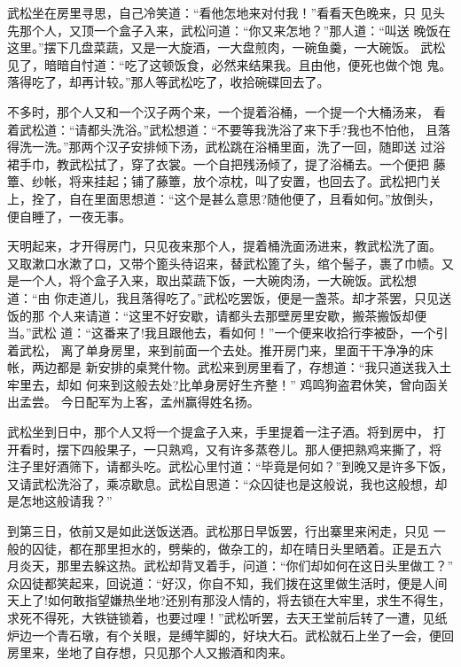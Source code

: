 武松坐在房里寻思，自己冷笑道：“看他怎地来对付我！”看看天色晚来，只
见头先那个人，又顶一个盒子入来，武松问道：“你又来怎地？”那人道：“叫送
晚饭在这里。”摆下几盘菜蔬，又是一大旋酒，一大盘煎肉，一碗鱼羹，一大碗饭。
武松见了，暗暗自忖道：“吃了这顿饭食，必然来结果我。且由他，便死也做个饱
鬼。落得吃了，却再计较。”那人等武松吃了，收拾碗碟回去了。

不多时，那个人又和一个汉子两个来，一个提着浴桶，一个提一个大桶汤来，
看着武松道：“请都头洗浴。”武松想道：“不要等我洗浴了来下手?我也不怕他，
且落得洗一洗。”那两个汉子安排倾下汤，武松跳在浴桶里面，洗了一回，随即送
过浴裙手巾，教武松拭了，穿了衣裳。一个自把残汤倾了，提了浴桶去。一个便把
藤簟、纱帐，将来挂起；铺了藤簟，放个凉枕，叫了安置，也回去了。武松把门关
上，拴了，自在里面思想道：“这个是甚么意思?随他便了，且看如何。”放倒头，
便自睡了，一夜无事。

天明起来，才开得房门，只见夜来那个人，提着桶洗面汤进来，教武松洗了面。
又取漱口水漱了口，又带个篦头待诏来，替武松篦了头，绾个髻子，裹了巾帻。又
是一个人，将个盒子入来，取出菜蔬下饭，一大碗肉汤，一大碗饭。武松想道：“由
你走道儿，我且落得吃了。”武松吃罢饭，便是一盏茶。却才茶罢，只见送饭的那
个人来请道：“这里不好安歇，请都头去那壁房里安歇，搬茶搬饭却便当。”武松
道：“这番来了!我且跟他去，看如何！”一个便来收拾行李被卧，一个引着武松，
离了单身房里，来到前面一个去处。推开房门来，里面干干净净的床帐，两边都是
新安排的桌凳什物。武松来到房里看了，存想道：“我只道送我入土牢里去，却如
何来到这般去处?比单身房好生齐整！”
鸡鸣狗盗君休笑，曾向函关出孟尝。
今日配军为上客，孟州赢得姓名扬。

武松坐到日中，那个人又将一个提盒子入来，手里提着一注子酒。将到房中，
打开看时，摆下四般果子，一只熟鸡，又有许多蒸卷儿。那人便把熟鸡来撕了，将
注子里好酒筛下，请都头吃。武松心里忖道：“毕竟是何如？”到晚又是许多下饭，
又请武松洗浴了，乘凉歇息。武松自思道：“众囚徒也是这般说，我也这般想，却
是怎地这般请我？”

到第三日，依前又是如此送饭送酒。武松那日早饭罢，行出寨里来闲走，只见
一般的囚徒，都在那里担水的，劈柴的，做杂工的，却在晴日头里晒着。正是五六
月炎天，那里去躲这热。武松却背叉着手，问道：“你们却如何在这日头里做工？”
众囚徒都笑起来，回说道：“好汉，你自不知，我们拨在这里做生活时，便是人间
天上了!如何敢指望嫌热坐地?还别有那没人情的，将去锁在大牢里，求生不得生，
求死不得死，大铁链锁着，也要过哩！”武松听罢，去天王堂前后转了一遭，见纸
炉边一个青石墩，有个关眼，是缚竿脚的，好块大石。武松就石上坐了一会，便回
房里来，坐地了自存想，只见那个人又搬酒和肉来。

